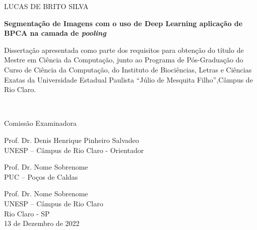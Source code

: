 \newpage
\thispagestyle{empty}

\begin{center}
    {LUCAS DE BRITO SILVA\\}
    
    \vspace{2cm}
    
    \textbf{Segmentação de Imagens com o uso de Deep Learning aplicação de BPCA na camada de \textit{pooling}}
    
    \vspace{4cm}
    
    \hspace{.45\linewidth}
    \begin{minipage}{.50\linewidth}
    \small
        Dissertação apresentada como parte dos requisitos para obtenção do título de Mestre em Ciência da Computação, junto ao Programa de Pós-Graduação do Curso de Ciência da Computação, do Instituto de Biociências, Letras e Ciências Exatas da Universidade Estadual Paulista “Júlio de Mesquita Filho”,Câmpus de Rio Claro.
    \end{minipage} \\
    \normalsize
    
    \vspace{1cm}
    
    Comissão Examinadora\\
    
    \vspace{1cm}

    Prof. Dr. Denis Henrique Pinheiro Salvadeo\\
    UNESP – Câmpus de Rio Claro - Orientador\\
    \vspace{0.5cm}


    Prof. Dr. Nome Sobrenome\\
    PUC – Poços de Caldas\\
    \vspace{0.5cm}


    Prof. Dr. Nome Sobrenome\\
    UNESP – Câmpus de Rio Claro \\

    
    \vspace{2cm}
    Rio Claro - SP \\
    13 de Dezembro de 2022
\end{center}
